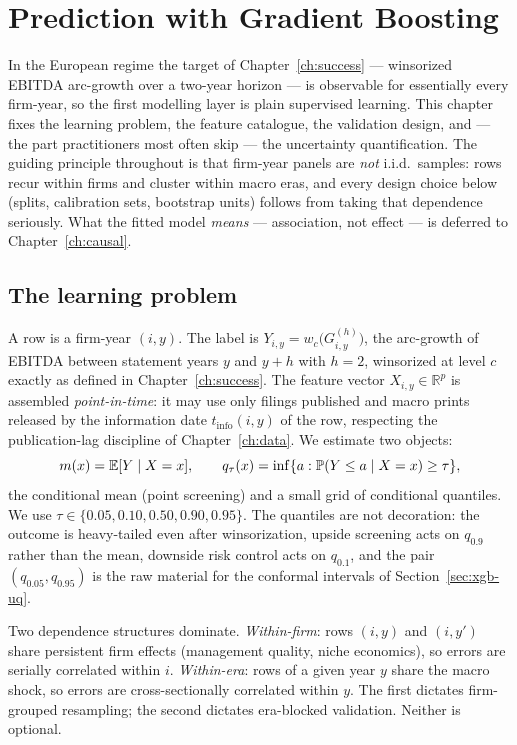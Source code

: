 \chapter{Prediction with Gradient Boosting}
\label{ch:xgb}

In the European regime the target of Chapter~\ref{ch:success} --- winsorized EBITDA
arc-growth over a two-year horizon --- is observable for essentially every firm-year, so
the first modelling layer is plain supervised learning. This chapter fixes the learning
problem, the feature catalogue, the validation design, and --- the part practitioners most
often skip --- the uncertainty quantification. The guiding principle throughout is that
firm-year panels are \emph{not} i.i.d.\ samples: rows recur within firms and cluster
within macro eras, and every design choice below (splits, calibration sets, bootstrap
units) follows from taking that dependence seriously. What the fitted model \emph{means}
--- association, not effect --- is deferred to Chapter~\ref{ch:causal}.

\section{The learning problem}
\label{sec:xgb-problem}

A row is a firm-year $(i,y)$. The label is
$Y_{i,y} = w_c\!\bigl(G^{(h)}_{i,y}\bigr)$, the arc-growth of EBITDA between statement
years $y$ and $y+h$ with $h=2$, winsorized at level $c$ exactly as defined in
Chapter~\ref{ch:success}. The feature vector $X_{i,y} \in \mathbb{R}^p$ is assembled
\emph{point-in-time}: it may use only filings published and macro prints released by the
information date $t_{\mathrm{info}}(i,y)$ of the row, respecting the publication-lag
discipline of Chapter~\ref{ch:data}. We estimate two objects:
\begin{equation}
m(x) = \mathbb{E}[Y \mid X = x],
\qquad
q_\tau(x) = \inf\{a : \mathbb{P}(Y \le a \mid X = x) \ge \tau\},
\label{eq:xgb-targets}
\end{equation}
the conditional mean (point screening) and a small grid of conditional quantiles. We
use $\tau \in \{0.05, 0.10, 0.50, 0.90, 0.95\}$. The quantiles are not decoration: the
outcome is heavy-tailed even after winsorization, upside screening acts on $q_{0.9}$
rather than the mean, downside risk control acts on $q_{0.1}$, and the pair
$(q_{0.05}, q_{0.95})$ is the raw material for the conformal intervals of
Section~\ref{sec:xgb-uq}.

Two dependence structures dominate. \emph{Within-firm}: rows $(i,y)$ and $(i,y')$ share
persistent firm effects (management quality, niche economics), so errors are serially
correlated within $i$. \emph{Within-era}: rows of a given year $y$ share the macro shock,
so errors are cross-sectionally correlated within $y$. The first dictates firm-grouped
resampling; the second dictates era-blocked validation. Neither is optional.

